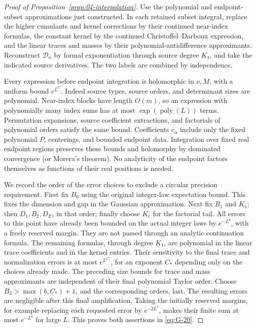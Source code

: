 \begin{proof}[Proof of Proposition~\ref{prop:04-interpolation}]
Use the polynomial and endpoint-subset approximations just constructed.
In each retained subset integral, replace the higher cumulants and
kernel corrections by their continued near-index formulas, the
constant kernel by the continued Christoffel--Darboux expression,
and the linear traces and masses by their polynomial-antidifference
approximants. Reconstruct \(\mathcal D_n\) by formal exponentiation
through source degree \(K_1\), and take the indicated source
derivatives. The two labels are combined by independence.

Every expression before endpoint integration is holomorphic in
\(\nu,M\), with a uniform bound \(e^{L^C}\). Indeed source types,
source orders, and determinant sizes are polynomial. Near-index
blocks have length \(O(m)\), so an expression with polynomially
many index sums has at most \(\exp(\operatorname{poly}(L))\)
terms. Permutation expansions, source coefficient extractions, and
factorials of polynomial orders satisfy the same bound. Coefficients
\(c_\alpha\) include only the fixed polynomial \(P\), centerings,
and bounded endpoint data. Integration over fixed real endpoint
regions preserves these bounds and holomorphy by dominated
convergence (or Morera's theorem). No analyticity of the endpoint
factors themselves as functions of their real positions is needed.

We record the order of the error choices to exclude a circular
precision requirement. First fix \(B_0\) using the original
integer-law expectation bound. This fixes the dimension and gap in
the Gaussian approximation. Next fix \(B_1\) and \(K_1\); then
\(D_1,B_2,D_E\), in that order; finally choose \(K_e\) for the
factorial tail. All errors to this point have already been bounded
on the actual integer laws by \(e^{-L^b}\), with a freely reserved
margin. They are not passed through an analytic continuation formula.
The remaining formulas, through degree \(K_1\), are polynomial in
the linear trace coefficients and in the kernel entries. Their
sensitivity to the final trace and normalization errors is at most
\(e^{L^{C_*}}\), for an exponent \(C_*\) depending only on the
choices already made. The preceding size bounds for trace and mass
approximants are independent of their final polynomial Taylor order.
Choose \(B_3>\max(b,C_*)+1\), and the corresponding orders, last.
The resulting errors are negligible after this final amplification.
Taking the initially reserved margins, for example replacing each
requested error by \(e^{-2L^b}\), makes their finite sum at most
\(e^{-L^b}\) for large \(L\). This proves both assertions in
\eqref{eq:G-20}.
\end{proof}

